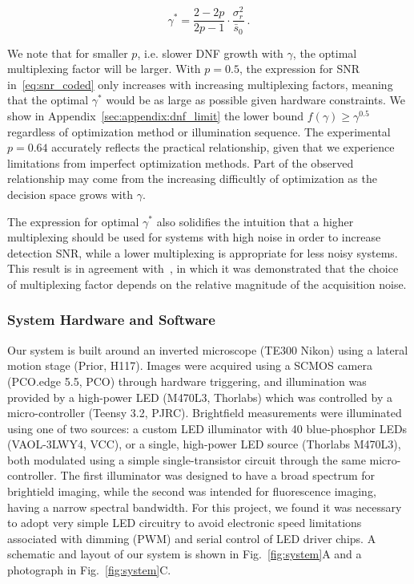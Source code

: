 \begin{equation}
    \label{eq:optimal_gamma}
    \gamma^* = \frac{2-2p}{2p-1} \cdot \frac{\sigma_r^2}{\bar{s}_0}\:.
\end{equation}

We note that for smaller $p$, i.e. slower DNF growth with $\gamma$, the optimal multiplexing factor will be larger.
With $p=0.5$, the expression for SNR in~\eqref{eq:snr_coded} only increases with increasing multiplexing factors, meaning that the optimal $\gamma^*$ would be as large as possible given hardware constraints.
We show in Appendix~\ref{sec:appendix:dnf_limit} the lower bound $f(\gamma)\geq \gamma^{0.5}$ regardless of optimization method or illumination sequence.
The experimental $p=0.64$ accurately reflects the practical relationship, given that we experience limitations from imperfect optimization methods. Part of the observed relationship may come from the increasing difficultly of optimization as the decision space grows with $\gamma$.

The expression for optimal $\gamma^*$ also solidifies the intuition that a higher multiplexing should be used for systems with high noise in order to increase detection SNR, while a lower multiplexing is appropriate for less noisy systems. This result is in agreement with~\cite{agrawal2009optimal}, in which it was demonstrated that the choice of multiplexing factor depends on the relative magnitude of the acquisition noise.

\subsubsection{System Hardware and Software} \label{sec:highthroughput:hardware}
Our system is built around an inverted microscope (TE300 Nikon) using a lateral motion stage (Prior, H117). Images were acquired using a SCMOS camera (PCO.edge 5.5, PCO) through hardware triggering, and illumination was provided by a high-power LED (M470L3, Thorlabs) which was controlled by a micro-controller (Teensy 3.2, PJRC). Brightfield measurements were illuminated using one of two sources: a custom LED illuminator with 40 blue-phosphor LEDs (VAOL-3LWY4, VCC), or a single, high-power LED source (Thorlabs M470L3), both modulated using a simple single-transistor circuit through the same micro-controller. The first illuminator was designed to have a broad spectrum for brightield imaging, while the second was intended for fluorescence imaging, having a narrow spectral bandwidth. For this project, we found it was necessary to adopt very simple LED circuitry to avoid electronic speed limitations associated with dimming (PWM) and serial control of LED driver chips. A schematic and layout of our system is shown in Fig.~\ref{fig:system}A and a photograph in Fig.~\ref{fig:system}C.

